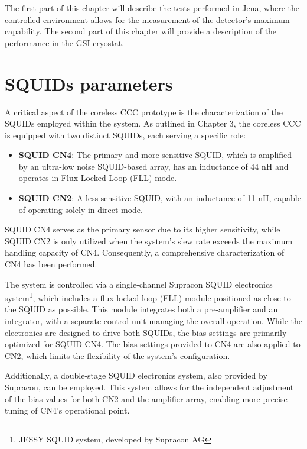 \documentclass[12pt,a4paper]{report}
\begin{document}
        The first part of this chapter will describe the tests performed in Jena, where the controlled environment allows for the measurement of the detector's maximum capability. The second part of this chapter will provide a description of the performance in the GSI cryostat.
        \section{SQUIDs parameters}
        A critical aspect of the coreless CCC prototype is the characterization of the SQUIDs employed within the system. As outlined in Chapter 3, the coreless CCC is equipped with two distinct SQUIDs, each serving a specific role:
        
        \begin{itemize}
        	\item \textbf{SQUID CN4}: The primary and more sensitive SQUID, which is amplified by an ultra-low noise SQUID-based array, has an inductance of 44 nH and operates in Flux-Locked Loop (FLL) mode.
        	\item \textbf{SQUID CN2}: A less sensitive SQUID, with an inductance of 11 nH, capable of operating solely in direct mode.
        \end{itemize}
        
        SQUID CN4 serves as the primary sensor due to its higher sensitivity, while SQUID CN2 is only utilized when the system's slew rate exceeds the maximum handling capacity of CN4. Consequently, a comprehensive characterization of CN4 has been performed.
        
        The system is controlled via a single-channel Supracon SQUID electronics system\footnote{JESSY SQUID system, developed by Supracon AG}, which includes a flux-locked loop (FLL) module positioned as close to the SQUID as possible. This module integrates both a pre-amplifier and an integrator, with a separate control unit managing the overall operation. While the electronics are designed to drive both SQUIDs, the bias settings are primarily optimized for SQUID CN4. The bias settings provided to CN4 are also applied to CN2, which limits the flexibility of the system's configuration. 
        
        Additionally, a double-stage SQUID electronics system, also provided by Supracon, can be employed. This system allows for the independent adjustment of the bias values for both CN2 and the amplifier array, enabling more precise tuning of CN4's operational point. 
        
\end{document}
